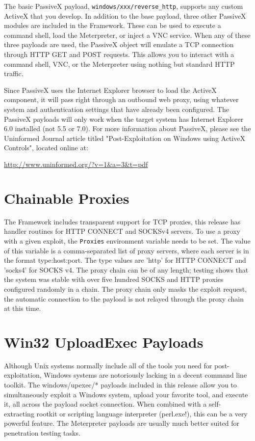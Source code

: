 \documentclass{report}
\begin{document}
\par
The basic PassiveX payload, \texttt{windows/xxx/reverse\_http}, supports any
custom ActiveX that you develop. In addition to the base payload, three other
PassiveX modules are included in the Framework. These can be used to execute a
command shell, load the Meterpreter, or inject a VNC service. When any of
these three payloads are used, the PassiveX object will emulate a TCP
connection through HTTP GET and POST requests. This allows you to interact
with a command shell, VNC, or the Meterpreter using nothing but standard HTTP
traffic.

\par
Since PassiveX uses the Internet Explorer browser to load the ActiveX
component, it will pass right through an outbound web proxy, using whatever
system and authentication settings that have already been configured. The
PassiveX payloads will only work when the target system has Internet Explorer
6.0 installed (not 5.5 or 7.0). For more information about PassiveX,
please see the Uninformed Journal article titled "Post-Exploitation on Windows
using ActiveX Controls", located online at:

\url{http://www.uninformed.org/?v=1&a=3&t=pdf}

\section{Chainable Proxies}
\par
The Framework includes transparent support for TCP proxies, this release has
handler routines for HTTP CONNECT and SOCKSv4 servers. To use a proxy with a
given exploit, the \texttt{Proxies} environment variable needs to be set. The value of
this variable is a comma-separated list of proxy servers, where each server is
in the format type:host:port. The type values are 'http' for HTTP CONNECT and
'socks4' for SOCKS v4. The proxy chain can be of any length; testing shows that
the system was stable with over five hundred SOCKS and HTTP proxies configured
randomly in a chain. The proxy chain only masks the exploit request, the
automatic connection to the payload is not relayed through the proxy chain at
this time. 

\section{Win32 UploadExec Payloads}
\par
Although Unix systems normally include all of the tools you need for
post-exploitation, Windows systems are notoriously lacking in a decent command
line toolkit. The windows/upexec/* payloads included in this release allow you to
simultaneously exploit a Windows system, upload your favorite tool, and execute
it, all across the payload socket connection. When combined with a
self-extracting rootkit or scripting language interpreter (perl.exe!), this can
be a very powerful feature. The Meterpreter payloads are usually much better
suited for penetration testing tasks.  
\end{document}
